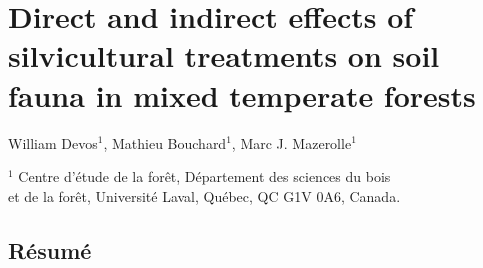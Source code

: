 \chapter{Direct and indirect effects of silvicultural treatments on soil fauna in mixed temperate forests}     %
\label{chapitre1-articles}    

William Devos$^1$, Mathieu Bouchard$^1$, Marc J. Mazerolle$^1$

$^1$ Centre d'étude de la forêt, Département des sciences du bois \\ 
et de la forêt, Université Laval, Québec, QC G1V 0A6, Canada. \\ 

\clearpage

\section*{Résumé}
\label{sec:resume1}

